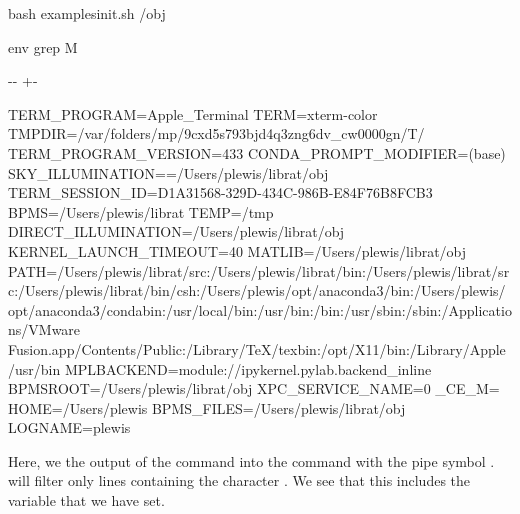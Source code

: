 \documentclass[letterpaper,10pt,english]{sphinxmanual}
\newlength\nbsphinxcodecellspacing
\begin{document}
{
\begin{sphinxVerbatim}[commandchars=\\\{\}]
\llap{\color{nbsphinxin}[4]:\,\hspace{\fboxrule}\hspace{\fboxsep}}\PYGZpc{}\PYGZpc{}bash
 examples\PYGZus{}init.sh
 /obj

env  grep M
\end{sphinxVerbatim}
}

{

\kern-\sphinxverbatimsmallskipamount\kern-\baselineskip
\kern+\FrameHeightAdjust\kern-\fboxrule
\vspace{\nbsphinxcodecellspacing}

\begin{sphinxVerbatim}[commandchars=\\\{\}]
TERM\_PROGRAM=Apple\_Terminal
TERM=xterm-color
TMPDIR=/var/folders/mp/9cxd5s793bjd4q3zng6dv\_cw0000gn/T/
TERM\_PROGRAM\_VERSION=433
CONDA\_PROMPT\_MODIFIER=(base)
SKY\_ILLUMINATION==/Users/plewis/librat/obj
TERM\_SESSION\_ID=D1A31568-329D-434C-986B-E84F76B8FCB3
BPMS=/Users/plewis/librat
TEMP=/tmp
DIRECT\_ILLUMINATION=/Users/plewis/librat/obj
KERNEL\_LAUNCH\_TIMEOUT=40
MATLIB=/Users/plewis/librat/obj
PATH=/Users/plewis/librat/src:/Users/plewis/librat/bin:/Users/plewis/librat/src:/Users/plewis/librat/bin/csh:/Users/plewis/opt/anaconda3/bin:/Users/plewis/opt/anaconda3/condabin:/usr/local/bin:/usr/bin:/bin:/usr/sbin:/sbin:/Applications/VMware Fusion.app/Contents/Public:/Library/TeX/texbin:/opt/X11/bin:/Library/Apple/usr/bin
MPLBACKEND=module://ipykernel.pylab.backend\_inline
BPMSROOT=/Users/plewis/librat/obj
XPC\_SERVICE\_NAME=0
\_CE\_M=
HOME=/Users/plewis
BPMS\_FILES=/Users/plewis/librat/obj
LOGNAME=plewis
\end{sphinxVerbatim}
}

Here, we  the output of the command  into the command  with the pipe symbol \sphinxcode{\sphinxupquote{|}}.  will filter only lines containing the character . We see that this includes the variable  that we have set.
\end{document}
